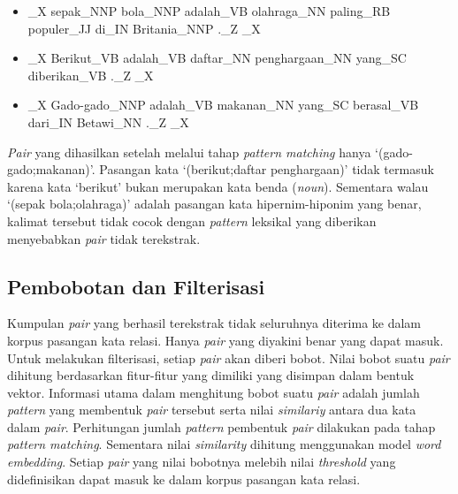 \begin{itemize}
  \item {\tagStart}\_X sepak\_NNP bola\_NNP adalah\_VB olahraga\_NN paling\_RB populer\_JJ di\_IN Britania\_NNP .\_Z {\tagEnd}\_X
  \item {\tagStart}\_X Berikut\_VB adalah\_VB daftar\_NN penghargaan\_NN yang\_SC diberikan\_VB .\_Z {\tagEnd}\_X
  \item {\tagStart}\_X Gado-gado\_NNP adalah\_VB makanan\_NN yang\_SC berasal\_VB dari\_IN Betawi\_NN .\_Z {\tagEnd}\_X
\end{itemize}

\textit{Pair} yang dihasilkan setelah melalui tahap \textit{pattern matching} hanya `(gado-gado;makanan)'. Pasangan kata `(berikut;daftar penghargaan)' tidak termasuk karena kata `berikut' bukan merupakan kata benda (\textit{noun}). Sementara walau `(sepak bola;olahraga)' adalah pasangan kata hipernim-hiponim yang benar, kalimat tersebut tidak cocok dengan \textit{pattern} leksikal yang diberikan menyebabkan \textit{pair} tidak terekstrak.

\subsection{Pembobotan dan Filterisasi}
Kumpulan \textit{pair} yang berhasil terekstrak tidak seluruhnya diterima ke dalam korpus pasangan kata relasi. Hanya \textit{pair} yang diyakini benar yang dapat masuk. Untuk melakukan filterisasi, setiap \textit{pair} akan diberi bobot. Nilai bobot suatu \textit{pair} dihitung berdasarkan fitur-fitur yang dimiliki yang disimpan dalam bentuk vektor. Informasi utama dalam menghitung bobot suatu \textit{pair} adalah jumlah \textit{pattern} yang membentuk \textit{pair} tersebut serta nilai \textit{similariy} antara dua kata dalam \textit{pair}. Perhitungan jumlah \textit{pattern} pembentuk \textit{pair} dilakukan pada tahap \textit{pattern matching}. Sementara nilai \textit{similarity} dihitung menggunakan model \textit{word embedding}. Setiap \textit{pair} yang nilai bobotnya melebih nilai \textit{threshold} yang didefinisikan dapat masuk ke dalam korpus pasangan kata relasi.


